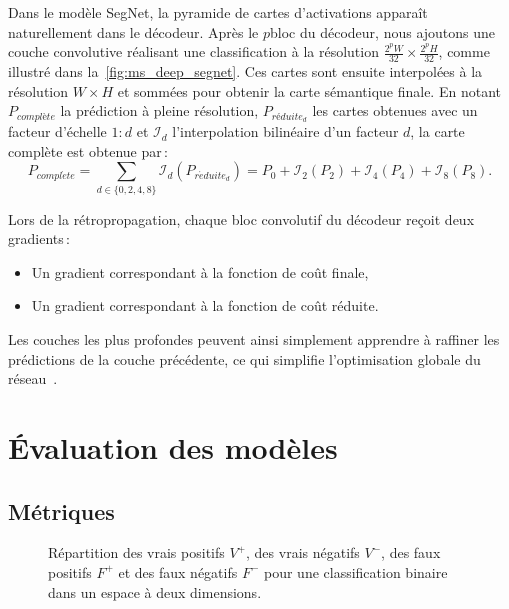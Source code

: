 Dans le modèle SegNet, la pyramide de cartes d'activations apparaît naturellement dans le décodeur. Après le $p$\ieme bloc du décodeur, nous ajoutons une couche convolutive réalisant une classification à la résolution $\frac{2^p W}{32} \times \frac{2^p H}{32}$, comme illustré dans la~\cref{fig:ms_deep_segnet}. Ces cartes sont ensuite interpolées à la résolution $W\times H$ et sommées pour obtenir la carte sémantique finale. En notant $P_{\mathit{complète}}$ la prédiction à pleine résolution, $P_{\mathit{réduite}_d}$ les cartes obtenues avec un facteur d'échelle $1:d$ et $\mathcal{I}_d$ l'interpolation bilinéaire d'un facteur $d$, la carte complète est obtenue par\,:
\begin{equation}
P_{\mathit{compl\grave{e}te}} = \sum_{d \in \{0, 2, 4, 8\}} \mathcal{I}_d(P_{\mathit{r\acute{e}duite}_d}) = P_0 + \mathcal{I}_2(P_2) + \mathcal{I}_4(P_4) + \mathcal{I}_8(P_8).
\end{equation}

Lors de la rétropropagation, chaque bloc convolutif du décodeur reçoit deux gradients\,:
\begin{itemize}
	\item Un gradient correspondant à la fonction de coût finale,
  \item Un gradient correspondant à la fonction de coût réduite.
\end{itemize}
Les couches les plus profondes peuvent ainsi simplement apprendre à raffiner les prédictions de la couche précédente, ce qui simplifie l'optimisation globale du réseau~\cite{lin_refinenet_2016}.

\section{Évaluation des modèles}

\subsection{Métriques}

\def\tp{V^+}
\def\tn{V^-}
\def\fp{F^+}
\def\fn{F^-}

\begin{figure}
	\resizebox{\textwidth}{!}{%
	
	}
	\caption{Répartition des vrais positifs $\tp$, des vrais négatifs $\tn$, des faux positifs $\fp$ et des faux négatifs $\fn$ pour une classification binaire dans un espace à deux dimensions.}
	\label{fig:classification_binaire}
\end{figure}

